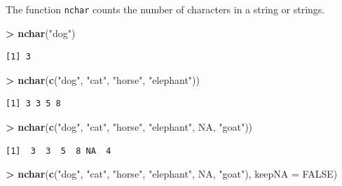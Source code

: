 \documentclass[]{krantz}
\makeatletter
\newenvironment{Shaded}{\begin{snugshade}}{\end{snugshade}}
\newcommand{\KeywordTok}[1]{\textcolor[rgb]{0.27,0.27,0.27}{\textbf{#1}}}
\newcommand{\DataTypeTok}[1]{\textcolor[rgb]{0.27,0.27,0.27}{#1}}
\newcommand{\StringTok}[1]{\textcolor[rgb]{0.5,0.5,0.5}{#1}}
\newcommand{\OtherTok}[1]{\textcolor[rgb]{0.37,0.37,0.37}{#1}}
\newcommand{\OperatorTok}[1]{\textcolor[rgb]{0.43,0.43,0.43}{\textbf{#1}}}
\newcommand{\NormalTok}[1]{#1}
\newenvironment{kframe}{%
\medskip{}
\setlength{\fboxsep}{.8em}
 \def\at@end@of@kframe{}%
 \ifinner\ifhmode%
  \def\at@end@of@kframe{\end{minipage}}%
  \begin{minipage}{\columnwidth}%
 \fi\fi%
 \def\FrameCommand##1{\hskip\@totalleftmargin \hskip-\fboxsep
 \colorbox{shadecolor}{##1}\hskip-\fboxsep
     \hskip-\linewidth \hskip-\@totalleftmargin \hskip\columnwidth}%
 \MakeFramed {\advance\hsize-\width
   \@totalleftmargin\z@ \linewidth\hsize
   \@setminipage}}%
 {\par\unskip\endMakeFramed%
 \at@end@of@kframe}
\renewenvironment{Shaded}{\begin{kframe}}{\end{kframe}}
\makeatother
\begin{document}
The function \texttt{nchar} counts the number of characters in a string
or strings.

\begin{Shaded}
\begin{Highlighting}[]
\OperatorTok{>}\StringTok{ }\KeywordTok{nchar}\NormalTok{(}\StringTok{"dog"}\NormalTok{)}
\end{Highlighting}
\end{Shaded}

\begin{verbatim}
[1] 3
\end{verbatim}

\begin{Shaded}
\begin{Highlighting}[]
\OperatorTok{>}\StringTok{ }\KeywordTok{nchar}\NormalTok{(}\KeywordTok{c}\NormalTok{(}\StringTok{"dog"}\NormalTok{, }\StringTok{"cat"}\NormalTok{, }\StringTok{"horse"}\NormalTok{, }\StringTok{"elephant"}\NormalTok{))}
\end{Highlighting}
\end{Shaded}

\begin{verbatim}
[1] 3 3 5 8
\end{verbatim}

\begin{Shaded}
\begin{Highlighting}[]
\OperatorTok{>}\StringTok{ }\KeywordTok{nchar}\NormalTok{(}\KeywordTok{c}\NormalTok{(}\StringTok{"dog"}\NormalTok{, }\StringTok{"cat"}\NormalTok{, }\StringTok{"horse"}\NormalTok{, }\StringTok{"elephant"}\NormalTok{, }\OtherTok{NA}\NormalTok{, }\StringTok{"goat"}\NormalTok{))}
\end{Highlighting}
\end{Shaded}

\begin{verbatim}
[1]  3  3  5  8 NA  4
\end{verbatim}

\begin{Shaded}
\begin{Highlighting}[]
\OperatorTok{>}\StringTok{ }\KeywordTok{nchar}\NormalTok{(}\KeywordTok{c}\NormalTok{(}\StringTok{"dog"}\NormalTok{, }\StringTok{"cat"}\NormalTok{, }\StringTok{"horse"}\NormalTok{, }\StringTok{"elephant"}\NormalTok{, }\OtherTok{NA}\NormalTok{, }\StringTok{"goat"}\NormalTok{), }\DataTypeTok{keepNA =} \OtherTok{FALSE}\NormalTok{)}
\end{Highlighting}
\end{Shaded}
\end{document}
